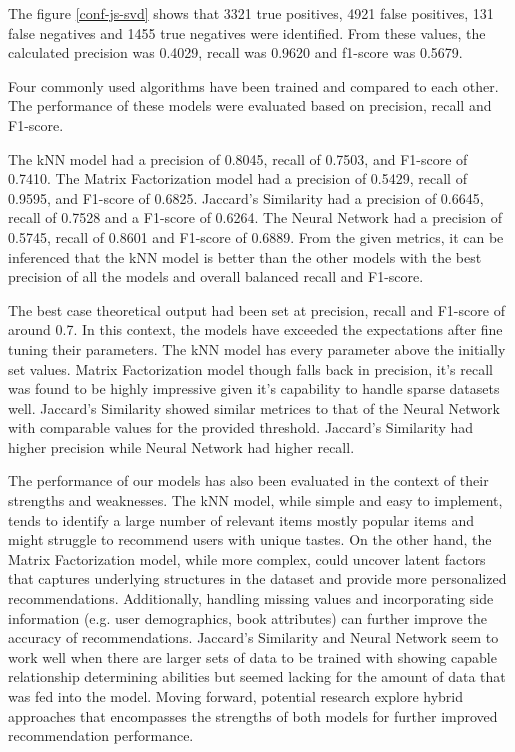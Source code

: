     \newpage

The figure \ref{conf-js-svd} shows that 3321 true positives, 4921 false positives, 131 false negatives and 1455 true negatives were identified. From these values, the calculated precision was 0.4029, recall was 0.9620 and f1-score was 0.5679.   

 Four commonly used algorithms have been trained and compared to each other. The performance of these models were evaluated based on precision, recall and F1-score.

The kNN model had a precision of 0.8045, recall of 0.7503, and F1-score of 0.7410. The Matrix Factorization model had a precision of 0.5429, recall of 0.9595, and F1-score of 0.6825. Jaccard's Similarity had a precision of 0.6645, recall of 0.7528 and a F1-score of 0.6264. The Neural Network had a precision of 0.5745, recall of 0.8601 and F1-score of 0.6889. From the given metrics, it can be inferenced that the kNN model is better than the other models with the best precision of all the models and overall balanced recall and F1-score.

The best case theoretical output had been set at precision, recall and F1-score of around 0.7. In this context, the models have exceeded the expectations after fine 
tuning their parameters. The kNN model has every parameter above the initially set values. Matrix Factorization model though falls back in precision, it's recall was found to be highly impressive given it's capability to handle sparse datasets well. Jaccard's Similarity showed similar metrices to that of the Neural Network with comparable values for the provided threshold. Jaccard's Similarity had higher precision while Neural Network had higher recall.

The performance of our models has also been evaluated in the context of their strengths and weaknesses. The kNN model, while simple and easy to implement, tends to identify a large number of relevant items mostly popular items and might struggle to recommend users with unique tastes. On the other hand, the Matrix Factorization model, while more complex, could uncover latent factors that  captures underlying structures in the dataset and provide more personalized recommendations. Additionally, handling missing values and incorporating side information (e.g. user demographics, book attributes) can further improve the accuracy of recommendations. Jaccard's Similarity and Neural Network seem to work well when there are larger sets of data to be trained with showing capable relationship determining abilities but seemed lacking for the amount of data that was fed into the model. Moving forward, potential research explore hybrid approaches that encompasses the strengths of both models for further improved recommendation performance.
